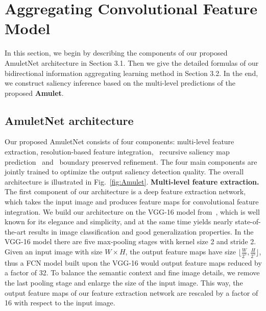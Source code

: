 \documentclass[10pt,twocolumn,letterpaper]{article}
\begin{document}
\section{Aggregating Convolutional Feature Model}
In this section, we begin by describing the components of our proposed AmuletNet architecture in Section 3.1. Then we give the detailed formulas of our bidirectional information aggregating learning method in Section 3.2. In the end, we construct saliency inference based on the multi-level predictions of the proposed \textbf{Amulet}.
%
\subsection{AmuletNet architecture}
Our proposed AmuletNet consists of four components: multi-level feature extraction, resolution-based feature integration,~ recursive saliency map prediction~ and~ boundary preserved refinement.
%
The four main components are jointly trained to optimize the output saliency detection quality.
%
The overall architecture is illustrated in Fig.~\ref{fig:Amulet}.
{\flushleft\textbf{Multi-level feature extraction.}}
The first component of our architecture is a deep feature extraction network, which takes the input image and produces feature maps for convolutional feature integration.
%
We build our architecture on the VGG-16 model from~\cite{simonyan2014very}, which is well known for its elegance and simplicity, and at the same time yields nearly state-of-the-art results in image classification and good generalization properties. In the VGG-16 model there are five max-pooling stages with kernel size 2 and stride 2.
Given an input image with size $W\times H$, the output feature maps have size $\lfloor\frac{W}{2^5},\frac{H}{2^5}\rfloor$, thus a FCN model built upon the VGG-16 would output feature maps reduced by a factor of 32.
%
%
To balance the semantic context and fine image details, we remove the last pooling stage and enlarge the size of the input image.
%
This way, the output feature maps of our feature extraction network are rescaled by a factor of 16 with respect to the input image.
\end{document}
